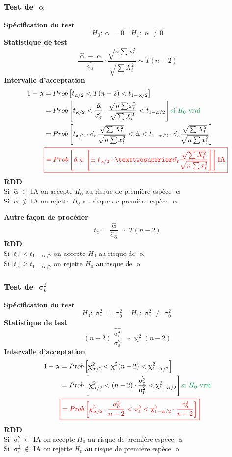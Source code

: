 \documentclass{article}
\newcommand{\halpha}{\hat{\upalpha}}
\newcommand{\sig}{\upsigma_\varepsilon^2}
\newcommand{\studn}{t_{\upalpha / 2}}
\newcommand{\studp}{t_{1 - \upalpha / 2}}
\newcommand{\chin}{\upchi_{\upalpha / 2}^2}
\newcommand{\chip}{\upchi_{1 - \upalpha / 2}^2}
\begin{document}
\subsubsection{Test de $\upalpha$}
\textbf{Spécification du test} \\
\[H_0 : \upalpha = 0 \quad H_1 : \upalpha \neq 0\]
\textbf{Statistique de test}
\[ \frac{\halpha - \upalpha}{\hat{\sigma_\varepsilon}} \cdot \frac{\sqrt{n \sum x_t^2}}{\sqrt{\sum X_t^2}} \sim T(n-2) \]
\textbf{Intervalle d'acceptation}
\begin{align*}
    1- \upalpha &= Prob\left[\studn < T(n-2) <\studp\right] \\
    &= Prob\left[\studn<  \frac{\halpha}{\hat{\sigma_\varepsilon}} \cdot \frac{\sqrt{n \sum x_t^2}}{\sqrt{\sum X_t^2}}<\studp\right] {\color{ForestGreen}\textrm{si }H_0 \textrm{ vrai}}\\
    &= Prob\left[\studn \cdot \hat{\sigma_\varepsilon} \frac{\sqrt{\sum X_t^2}}{\sqrt{n \sum x_t^2}}   < \halpha <\studp \cdot \hat{\sigma_\varepsilon} \frac{\sqrt{\sum X_t^2}}{\sqrt{n \sum x_t^2}} \right]\\
    &{\color{red} \boxed{= Prob\left[\halpha \in \left[\pm \; \studn \cdot² \hat{\sigma_\varepsilon} \frac{\sqrt{\sum X_t^2}}{\sqrt{n \sum x_t^2}}  \right]\right] \textrm{IA} }}
\end{align*}
\textbf{RDD } \\
Si $\halpha \in $ IA on accepte $H_0$ au risque de première espèce $\upalpha$ \\
Si $\halpha \notin $ IA on rejette $H_0$ au risque de première espèce $\upalpha$ 

\textbf{Autre façon de procéder} 
\[t_c = \frac{\halpha}{\hat{\sigma}_{\hat{\upalpha}}} \sim T(n-2)\]
\textbf{RDD}\\
Si $|t_c| < \studp $ on accepte $H_0$ au risque de $\upalpha$ \\
Si $|t_c| \geq \studp $ on rejette $H_0$ au risque de $\upalpha$ \\
\subsubsection{Test de $\sig$}
\textbf{Spécification du test} 
\[H_0 : \sig = \upsigma_0^2 \quad H_1 : \sig \neq \upsigma_0^2\]
\textbf{Statistique de test} 
\[(n-2) \frac{\hat{\sig}}{\sig} \sim \upchi^2 (n-2)\]
\textbf{Intervalle d'acceptation}
\begin{align*}
	1 - \upalpha &= Prob\left[\chin<\upchi^2 (n-2)<\chip\right] \\
	&= Prob\left[\chin < (n-2) \cdot \frac{\hat{\sig}}{\upsigma_0^2} < \chip \right] {\color{ForestGreen}\textrm{si }H_0 \textrm{ vrai}}\\
	&{\color{red}\boxed{ = Prob\left[\chin \cdot \frac{\upsigma_ 0^2}{n-2} < \sig < \chip \cdot \frac{\upsigma_ 0^2}{n-2} \right]}}
\end{align*}
\textbf{RDD} \\
	Si $\sig \in $ IA on accepte $H_0$ au risque de première espèce $\upalpha$ \\
	Si $\sig \notin $ IA on rejette $H_0$ au risque de première espèce $\upalpha$
\end{document}
